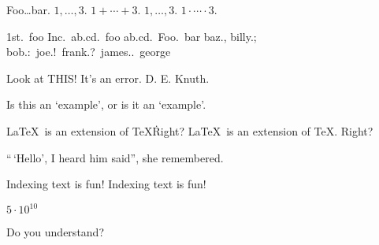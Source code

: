 
\begin{foo} \begin{bar} \end{bar}\end{foo}


Foo\dots bar. $1,\ldots,3$. $1+\cdots+3$. $1,\ldots,3$. $1\cdot\cdots\cdot3$.


1st.\ foo Inc.\ ab.cd.\ foo ab.cd.\ Foo.\ bar baz., billy.; bob.:\ joe.!\ frank.?\ james..\ george


Look at THIS\@! It's an error. D. E. Knuth.


{}


Is this an `example', or is it an `example'.




\LaTeX\ is an extension of \TeX\. Right?
\LaTeX\ is an extension of \TeX. Right?


``\,`Hello', I heard him said'', she remembered.


Indexing text is fun!
Indexing text%
     is fun!


$5\cdot10^{10}$


Do you understand?

